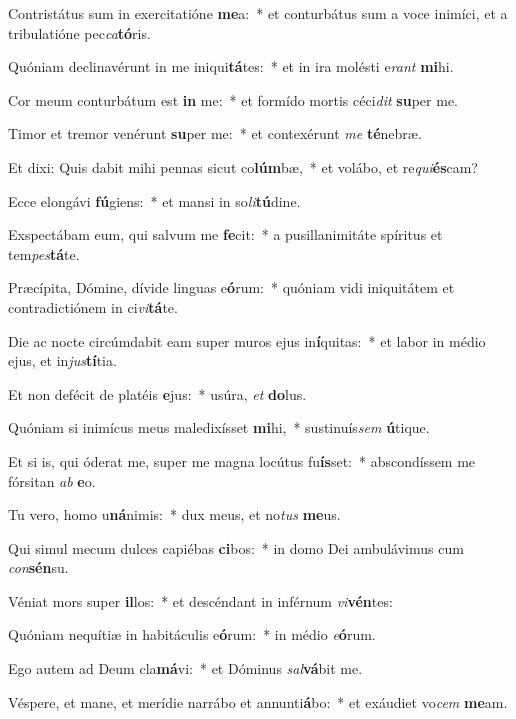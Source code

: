 \item Contristátus sum in exercitatióne \textbf{me}a:~* et conturbátus sum a voce inimíci, et a tribulatióne pec\textit{ca}\textbf{tó}ris.
\item Quóniam declinavérunt in me iniqui\textbf{tá}tes:~* et in ira molésti e\textit{rant} \textbf{mi}hi.
\item Cor meum conturbátum est \textbf{in} me:~* et formído mortis céci\textit{dit} \textbf{su}per me.
\item Timor et tremor venérunt \textbf{su}per me:~* et contexérunt \textit{me} \textbf{té}nebræ.
\item Et dixi: Quis dabit mihi pennas sicut co\textbf{lúm}bæ,~* et volábo, et re\textit{qui}\textbf{és}cam?
\item Ecce elongávi \textbf{fú}giens:~* et mansi in so\textit{li}\textbf{tú}dine.
\item Exspectábam eum, qui salvum me \textbf{fe}cit:~* a pusillanimitáte spíritus et tem\textit{pes}\textbf{tá}te.
\item Præcípita, Dómine, dívide linguas e\textbf{ó}rum:~* quóniam vidi iniquitátem et contradictiónem in ci\textit{vi}\textbf{tá}te.
\item Die ac nocte circúmdabit eam super muros ejus in\textbf{í}quitas:~* et labor in médio ejus, et in\textit{jus}\textbf{tí}tia.
\item Et non defécit de platéis \textbf{e}jus:~* usúra, \textit{et} \textbf{do}lus.
\item Quóniam si inimícus meus maledixísset \textbf{mi}hi,~* sustinuís\textit{sem} \textbf{ú}tique.
\item Et si is, qui óderat me, super me magna locútus fu\textbf{ís}set:~* abscondíssem me fórsitan \textit{ab} \textbf{e}o.
\item Tu vero, homo u\textbf{ná}nimis:~* dux meus, et no\textit{tus} \textbf{me}us.
\item Qui simul mecum dulces capiébas \textbf{ci}bos:~* in domo Dei ambulávimus cum \textit{con}\textbf{sén}su.
\item Véniat mors super \textbf{il}los:~* et descéndant in inférnum \textit{vi}\textbf{vén}tes:
\item Quóniam nequítiæ in habitáculis e\textbf{ó}rum:~* in médio \textit{e}\textbf{ó}rum.
\item Ego autem ad Deum cla\textbf{má}vi:~* et Dóminus \textit{sal}\textbf{vá}bit me.
\item Véspere, et mane, et merídie narrábo et annunti\textbf{á}bo:~* et exáudiet vo\textit{cem} \textbf{me}am.
